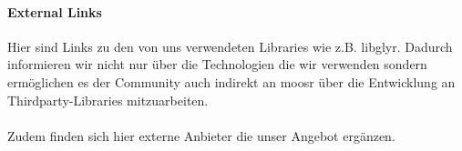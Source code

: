 \paragraph{External Links}
Hier sind Links zu den von uns verwendeten Libraries wie z.B. libglyr. Dadurch
informieren wir nicht nur über die Technologien die wir verwenden sondern
ermöglichen es der Community auch indirekt an moosr über die Entwicklung an
Thirdparty-Libraries mitzuarbeiten.
\\
\\
Zudem finden sich hier externe Anbieter die unser Angebot ergänzen.
